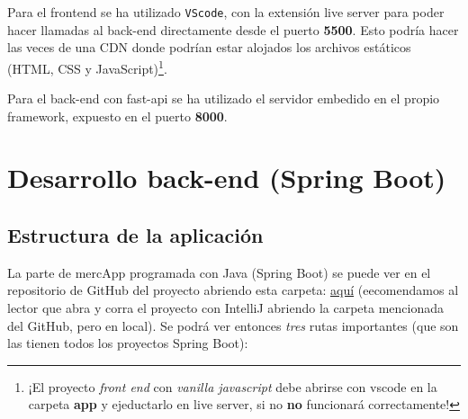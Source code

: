 \documentclass[a4paper,12pt]{report}
\begin{document}
				Para el frontend se ha utilizado \texttt{VScode}, con la extensión live server para poder hacer llamadas al back-end directamente desde el puerto \textbf{5500}. Esto podría hacer las veces de una CDN donde podrían estar alojados los archivos estáticos (HTML, CSS y JavaScript)\footnote{¡El proyecto \textit{front end} con \textit{vanilla javascript} debe abrirse con vscode en la carpeta \textbf{app} y ejeductarlo en live server, si no \textbf{no} funcionará correctamente!}.
				
				Para el back-end con fast-api se ha utilizado el servidor embedido en el propio framework, expuesto en el puerto \textbf{8000}.
		
	
		
			

			
			\section{Desarrollo back-end (Spring Boot)}
			\label{sec:parteSpringBoot}
			
				\subsection{Estructura de la aplicación}
				\label{sec:estructuraAplicacion}
				
				La parte de mercApp programada con Java (Spring Boot) se puede ver en el repositorio de GitHub del proyecto abriendo esta carpeta: \href{https://github.com/blackcub3s/mercApp/tree/main/APP%20WEB/__springboot__produccio__/app}{aquí} (eecomendamos al lector que abra y corra el proyecto con IntelliJ abriendo la carpeta mencionada del GitHub, pero en local). Se podrá ver entonces \textit{tres} rutas importantes (que son las tienen todos los proyectos Spring Boot):
				
\end{document}
